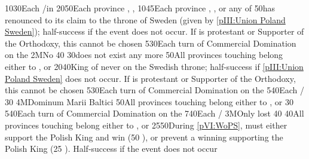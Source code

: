 %
%
%
{10}{30}{Each \COL/\TP in }%
%
%
{20}{50}{Each province \provinceNeva, \provinceLivonija, \provinceEstland}%
%
%
{10}{45}{Each province \provinceSkane, \provinceVastergotland,
  \provinceGotland or any of \regionNorvege}%
%
%
{}{50}{\POL has renounced to its claim to the throne of Sweden (given by
  \ref{pIII:Union Poland Sweden}); half-success if the event does not
  occur. If \POL is protestant or Supporter of the Orthodoxy, this cannot be
  chosen}%
%
%
%
{5}{30}{Each turn of Commercial Domination on the }%
%
\EUobjective2M{No }{}%
{}{40}{}%
%
%
{}{30}{\payshanse does not exist any more}%
%
%
{}{50}{All provinces touching \regionBaltique belong either to \SUE,
  \paysbrandebourg or \paysdanemark}%
%
%
{20}{40}{King of  never on the Swedish throne;
  half-success if \ref{pIII:Union Poland Sweden} does not occur. If \POL is
  protestant or Supporter of the Orthodoxy, this cannot be chosen}%
%
%
%
{5}{30}{Each turn of Commercial Domination on the }%
%
%
{5}{40}{Each \COL/\TP}%
%
%
{}{30}{}%
%
\EUobjective4M{Dominum Marii Baltici}{}%
{}{50}{All provinces touching \regionBaltique belong either to \SUE,
  \paysbrandebourg or \paysdanemark}%
%
%
{}{30}{}%
%
%
%
{5}{40}{Each turn of Commercial Domination on the }%
%
%
{7}{40}{Each \COL/\TP}%
%
\EUobjective3M{Only \provinceNeva lost}{}%
{}{40}{}%
%
%
{}{40}{All provinces touching \regionBaltique belong either to \SUE,
  \paysbrandebourg or \paysdanemark}%
%
%
{25}{50}{During \ref{pVI:WoPS}, \SUE must either support the Polish King and
  win (50 \VPs), or prevent a winning \FRA supporting the Polish King (25
  \VPs). Half-success if the event does not occur}%
%
%
%

